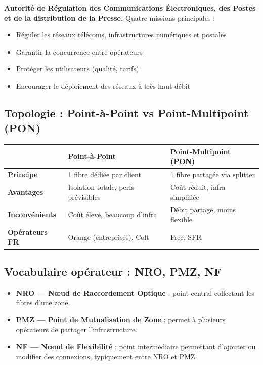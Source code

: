 \documentclass[11pt,a4paper]{article}
\begin{document}
\begin{defbox}[title={\faGavel~ARCEP}]
\textbf{Autorité de Régulation des Communications Électroniques, des Postes et de la distribution de la Presse.} Quatre missions principales :
\begin{itemize}
  \item Réguler les réseaux télécoms, infrastructures numériques et postales
  \item Garantir la concurrence entre opérateurs
  \item Protéger les utilisateurs (qualité, tarifs)
  \item Encourager le déploiement des réseaux à très haut débit
\end{itemize}
\end{defbox}

\subsection{Topologie : Point-à-Point vs Point-Multipoint (PON)}

\begin{tabularx}{\linewidth}{@{}>{\bfseries}p{3.2cm} X X@{}}
\toprule
\rowcolor{light} & Point-à-Point & Point-Multipoint (PON) \\ \midrule
Principe          & 1 fibre dédiée par client & 1 fibre partagée via splitter \\
Avantages         & Isolation totale, perfs prévisibles & Coût réduit, infra simplifiée \\
Inconvénients     & Coût élevé, beaucoup d'infra & Débit partagé, moins flexible \\
Opérateurs FR     & Orange (entreprises), Colt & Free, SFR \\
\bottomrule
\end{tabularx}

\subsection{Vocabulaire opérateur : NRO, PMZ, NF}

\begin{itemize}
  \item \textbf{NRO — Nœud de Raccordement Optique} : point central collectant les fibres d'une zone.
  \item \textbf{PMZ — Point de Mutualisation de Zone} : permet à plusieurs opérateurs de partager l'infrastructure.
  \item \textbf{NF — Nœud de Flexibilité} : point intermédiaire permettant d'ajouter ou modifier des connexions, typiquement entre NRO et PMZ.
\end{itemize}
\end{document}
